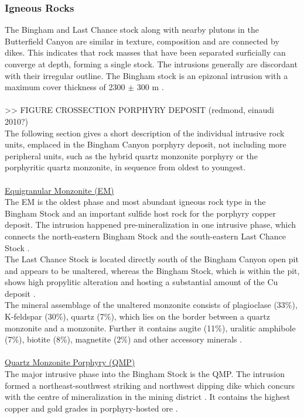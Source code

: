 \documentclass[a4paper,11pt,titlepage]{article}
\begin{document}
\subsubsection{Igneous Rocks}

The Bingham and Last Chance stock along with nearby plutons in the Butterfield Canyon are similar in texture, composition and are connected by dikes. This indicates that rock masses that have been separated surficially can converge at depth, forming a single stock. The intrusions generally are discordant with their irregular outline. The Bingham stock is an epizonal intrusion with a maximum cover thickness of 2300 $\pm$ 300 m \citep{Lanier1978}.
\\
\\ >> FIGURE CROSSECTION PORPHYRY DEPOSIT (redmond, einaudi 2010?)
\\
The following section gives a short description of the individual intrusive rock units, emplaced in the Bingham Canyon porphyry deposit, not including more peripheral units, such as the hybrid quartz monzonite porphyry or the porphyritic quartz monzonite, in sequence from oldest to youngest. 
\\
\\\underline{Equigranular Monzonite (EM)}
\\The EM is the oldest phase and most abundant igneous rock type in the Bingham Stock and an important sulfide host rock for the porphyry copper deposit. The intrusion happened pre-mineralization in one intrusive phase, which connects the north-eastern Bingham Stock and the south-eastern Last Chance Stock \citep{Parry2001}.
\\ The Last Chance Stock is located directly south of the Bingham Canyon open pit and appears to be unaltered, whereas the Bingham Stock, which is within the pit, shows high propylitic alteration and hosting a substantial amount of the Cu deposit \citep{Babcock1995}.
\\ The mineral assemblage of the unaltered monzonite consists of plagioclase (33\%), K-feldspar (30\%), quartz (7\%), which lies on the border between a quartz monzonite and a monzonite. Further it contains augite (11\%), uralitic amphibole (7\%), biotite (8\%), magnetite (2\%) and other accessory minerals \citep{Lanier1978}.
\\
\\\underline{Quartz Monzonite Porphyry (QMP)}
\\ The major intrusive phase into the Bingham Stock is the QMP. The intrusion formed a northeast-southwest striking and northwest dipping dike which concurs with the centre of mineralization in the mining district \citep{Lanier1978}. It contains the highest copper and gold grades in porphyry-hosted ore \citep{Redmond2010a}.
\end{document}
